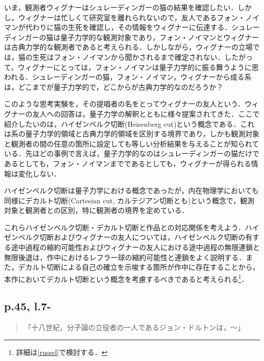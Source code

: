 \documentclass[10pt, a5paper, twoside]{jsarticle}
\theoremstyle{definition}
\begin{document}
                いま，観測者ウィグナーはシュレーディンガーの猫の結果を確認したい．しかし，ウィグナーは忙しくて研究室を離れられないので，友人であるフォン・ノイマンが代わりに猫の生死を確認し，その情報をウィグナーに伝達する．シュレーディンガーの猫は量子力学的な観測対象であり，フォン・ノイマンとウィグナーは古典力学的な観測者であると考えられる．しかしながら，ウィグナーの立場では，猫の生死はフォン・ノイマンから聞かされるまで確定されない．したがって，ウィグナーにとっては，フォン・ノイマンは量子力学的に振る舞うように思われる．シュレーディンガーの猫，フォン・ノイマン，ウィグナーから成る系は，どこまでが量子力学的で，どこからが古典力学的なのだろうか？

                このような思考実験を，その提唱者の名をとってウィグナーの友人という．ウィグナーの友人への回答は，量子力学の解釈とともに様々提案されてきた．ここで紹介したいのは，ハイゼンベルク切断(Heisenberg cut)という概念である．これは系の量子力学的領域と古典力学的領域を区別する境界であり，しかも観測対象と観測者の間の任意の箇所に設定しても等しい分析結果を与えることが知られている．先ほどの事例で言えば，量子力学的なのはシュレーディンガーの猫だけであるとしても，フォン・ノイマンまでであるとしても，ウィグナーが得られる情報は変化しない．

                ハイゼンベルク切断は量子力学における概念であったが，内在物理学においても同様にデカルト切断(Cartesian cut, カルテジアン切断とも)という概念で，観測対象と観測者との区別，特に観測者の境界を定めている\cite{cut}．

                これらハイゼンベルク切断・デカルト切断と作品との対応関係を考えよう．ハイゼンベルク切断およびウィグナーの友人については，ハイゼンベルク切断の有する途中過程の縮約可能性およびウィグナーの友人における途中過程の無限連鎖と無限後退は，作中におけるレフラー球の縮約可能性と連鎖をよく説明する．また，デカルト切断による自己の確立を示唆する箇所が作中に存在することから，本作においてデカルト切断という概念を考慮するべきであると考えられる\footnote{詳細は\ref{russel}で検討する．}．


            \subsection{p.45, l.7-}

                \begin{quote}

                    「十八世紀，分子論の立役者の一人であるジョン・ドルトンは，〜」

                \end{quote}
\end{document}
